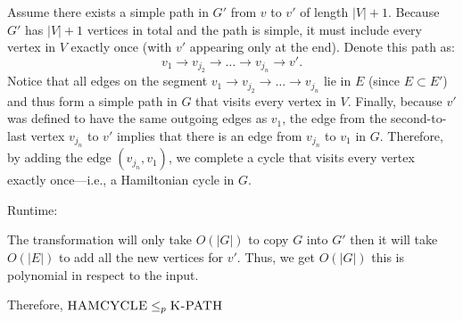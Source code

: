 \documentclass[12pt, letterpaper]{article}
\begin{document}
\begin{problemproof}
\begin{itemize}
        Assume there exists a simple path in \(G'\) from \(v\) to \(v'\) of length \(|V|+1\). Because \(G'\) has \(|V|+1\) vertices in total and the path is simple, it must include every vertex in \(V\) exactly once (with \(v'\) appearing only at the end).
        Denote this path as:
            \[
            v_1 \to v_{j_2} \to \dots \to v_{j_n} \to v'.
            \]
        Notice that all edges on the segment \(v_1 \to v_{j_2} \to \dots \to v_{j_n}\) lie in \(E\) (since \(E \subset E'\)) and thus form a simple path in \(G\) that visits every vertex in \(V\).
        Finally, because \(v'\) was defined to have the same outgoing edges as \(v_1\), the edge from the second-to-last vertex \(v_{j_n}\) to \(v'\) implies that there is an edge from \(v_{j_n}\) to \(v_1\) in \(G\).
        Therefore, by adding the edge \((v_{j_n},v_1)\), we complete a cycle that visits every vertex exactly once—i.e., a Hamiltonian cycle in \(G\).
    \end{itemize}

    Runtime:

    The transformation will only take $O(|G|)$ to copy $G$ into $G'$ then it will take $O(|E|)$ to add all the new vertices for $v'$. Thus, we get $O(|G|)$ this is polynomial in respect to the input.
    
    Therefore, $\textsc{HAMCYCLE} \leq_p \textsc{K-PATH}$
\end{problemproof}
\end{document}
